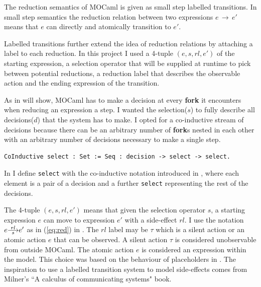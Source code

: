 \documentclass[12pt,twoside,notitlepage]{report}
\newcommand{\red}[2]{\stackon[.05ex]{\stackunder[-0.05ex]{$\longrightarrow$}{$\scriptstyle #1$}}{$\scriptstyle #2$}}
\theoremstyle{plain}%
\theoremstyle{definition}
\theoremstyle{remark}
\begin{document}
The reduction semantics of MOCaml is given as small step labelled transitions. In small step semantics the reduction relation between two expressions $ e\, \rightarrow\, e' $ means that $ e $ can directly and atomically transition to $ e' $. 

Labelled transitions further extend the idea of reduction relations by attaching a label to each reduction. In this project I used a 4-tuple $ (e, s, rl, e') $ of the starting expression, a selection operator that will be supplied at runtime to pick between potential reductions, a reduction label that describes the observable action and the ending expression of the transition.

As  in  will show, MOCaml has to make a decision at every \textbf{fork} it encounters when reducing an expression a step. I wanted the selection($ s $) to fully describe all decisions($ d $) that the system has to make. I opted for a co-inductive stream of decisions because there can be an arbitrary number of \textbf{fork}s nested in each other with an arbitrary number of decisions necessary to make a single step. \vspace{5mm}

\begin{minipage}{\linewidth}

\begin{lstlisting}[language={Coq},caption={Coq co-inductive decision sequence}, label={lst:coqselectstar}]
CoInductive select : Set := Seq : decision -> select -> select.
\end{lstlisting}

\end{minipage}

In  I define \verb|select| with the co-inductive notation introduced in , where each element is a pair of a decision and a further \verb|select| representing the rest of the decisions. 

The 4-tuple $ (e, s, rl, e') $ means that given the selection operator $ s $, a starting expression $ e $  can move to expression $ e' $ with a side-effect $ rl $. I use the notation $ e \red{s}{rl} e' $ as in (\ref{eq:red}) in . The $ rl $ label may be $ \tau $ which is a silent action or an atomic action $ e $ that can be observed. A silent action $\tau$ is considered unobservable from outside MOCaml. The atomic action $e$ is considered an expression within the model.  This choice was based on the behaviour of placeholders in . The inspiration to use a labelled transition system to model side-effects comes from Milner's ``A calculus of communicating systems" book\cite{milner1982calculus}.
\end{document}
